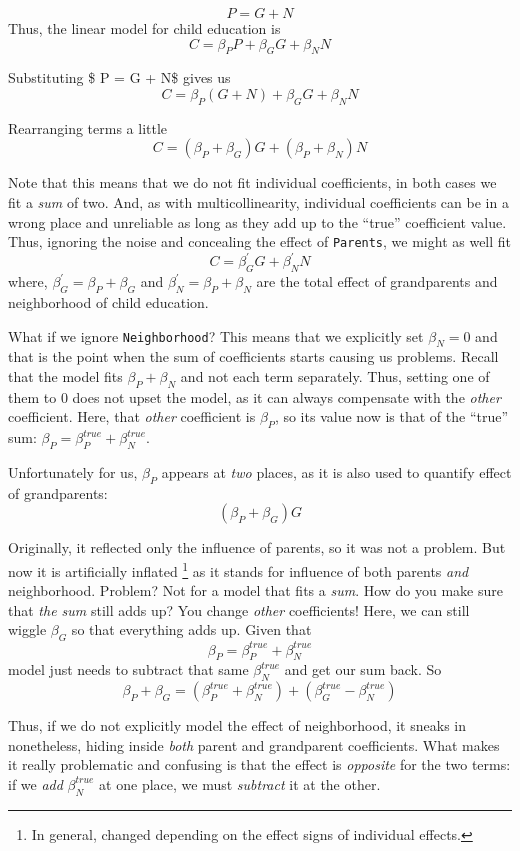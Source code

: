 \documentclass[
]{book}
\begin{document}
\[ P = G + N\]
Thus, the linear model for child education is
\[C = \beta_P P + \beta_G G + \beta_N N\]

Substituting \$ P = G + N\$ gives us
\[C = \beta_P (G + N) + \beta_G G + \beta_N N\]

Rearranging terms a little
\[C = (\beta_P + \beta_G) G + (\beta_P  + \beta_N) N\]

Note that this means that we do not fit individual coefficients, in both cases we fit a \emph{sum} of two. And, as with multicollinearity, individual coefficients can be in a wrong place and unreliable as long as they add up to the ``true'' coefficient value. Thus, ignoring the noise and concealing the effect of \texttt{Parents}, we might as well fit
\[C = \beta_G^\prime G + \beta_N^\prime N\]
where, \(\beta_G^\prime = \beta_P + \beta_G\) and \(\beta_N^\prime = \beta_P + \beta_N\) are the total effect of grandparents and neighborhood of child education.

What if we ignore \texttt{Neighborhood}? This means that we explicitly set \(\beta_N = 0\) and that is the point when the sum of coefficients starts causing us problems. Recall that the model fits \(\beta_P + \beta_N\) and not each term separately. Thus, setting one of them to 0 does not upset the model, as it can always compensate with the \emph{other} coefficient. Here, that \emph{other} coefficient is \(\beta_P\), so its value now is that of the ``true'' sum: \(\beta_P = \beta_P^{true} + \beta_N^{true}\).

Unfortunately for us, \(\beta_P\) appears at \emph{two} places, as it is also used to quantify effect of grandparents:
\[(\beta_P + \beta_G) G\]

Originally, it reflected only the influence of parents, so it was not a problem. But now it is artificially inflated \footnote{In general, changed depending on the effect signs of individual effects.} as it stands for influence of both parents \emph{and} neighborhood. Problem? Not for a model that fits a \emph{sum}. How do you make sure that \emph{the sum} still adds up? You change \emph{other} coefficients! Here, we can still wiggle \(\beta_G\) so that everything adds up. Given that
\[\beta_P = \beta_P^{true} + \beta_N^{true}\]
model just needs to subtract that same \(\beta_N^{true}\) and get our sum back. So
\[\beta_P + \beta_G = (\beta_P^{true} + \beta_N^{true}) + (\beta_G^{true} - \beta_N^{true})\]

Thus, if we do not explicitly model the effect of neighborhood, it sneaks in nonetheless, hiding inside \emph{both} parent and grandparent coefficients. What makes it really problematic and confusing is that the effect is \emph{opposite} for the two terms: if we \emph{add} \(\beta_N^{true}\) at one place, we must \emph{subtract} it at the other.
\end{document}
